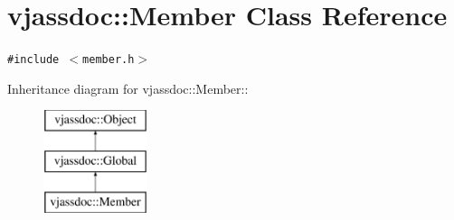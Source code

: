 \hypertarget{classvjassdoc_1_1Member}{
\section{vjassdoc::Member Class Reference}
\label{classvjassdoc_1_1Member}
}
{\tt \#include $<$member.h$>$}

Inheritance diagram for vjassdoc::Member::\begin{figure}[H]
\begin{center}
\leavevmode
\includegraphics[height=3cm]{classvjassdoc_1_1Member}
\end{center}
\end{figure}
